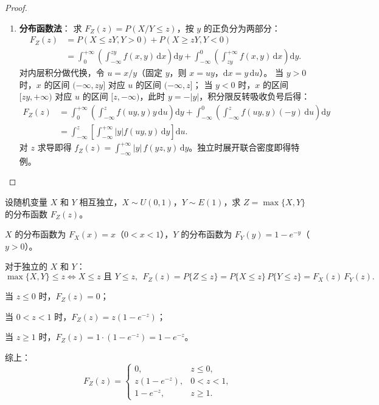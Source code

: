 \documentclass[lang=cn,11pt]{elegantbook}
\begin{document}
\begin{proof}
\begin{enumerate}
\begin{align*}
    \end{align*}
    对 $z$ 求导即得 $f_Z(z) = \displaystyle\int_{-\infty}^{+\infty}\frac{1}{|x|}\,f\!\left(x, \frac{z}{x}\right)\,\mathrm{d}x$。独立时展开联合密度即得特例。
    \item \textbf{分布函数法}：
    求 $F_Z(z) = P(X/Y \leqslant z)$，按 $y$ 的正负分为两部分：
    \begin{align*}
        F_Z(z) &= P(X \leqslant zY, Y > 0) + P(X \geqslant zY, Y < 0) \\
        &= \int_{0}^{+\infty} \left( \int_{-\infty}^{zy} f(x,y)\,\mathrm{d}x \right) \mathrm{d}y + \int_{-\infty}^{0} \left( \int_{zy}^{+\infty} f(x,y)\,\mathrm{d}x \right) \mathrm{d}y.
    \end{align*}
    对内层积分做代换，令 $u = x/y$（固定 $y$，则 $x = uy$，$\mathrm{d}x = y\,\mathrm{d}u$）。
    当 $y > 0$ 时，$x$ 的区间 $(-\infty, zy]$ 对应 $u$ 的区间 $(-\infty, z]$；
    当 $y < 0$ 时，$x$ 的区间 $[zy, +\infty)$ 对应 $u$ 的区间 $[z, -\infty)$，此时 $y = -|y|$，积分限反转吸收负号后得：
    \begin{align*}
    F_Z(z)& = \int_{0}^{+\infty} \left( \int_{-\infty}^{z} f(uy, y)y\,\mathrm{d}u \right) \mathrm{d}y + \int_{-\infty}^{0} \left( \int_{-\infty}^{z} f(uy, y)(-y)\,\mathrm{d}u \right) \mathrm{d}y\\
    & = \int_{-\infty}^{z} \left[ \int_{-\infty}^{+\infty} |y|f(uy, y)\,\mathrm{d}y \right] \mathrm{d}u.
    \end{align*}
    对 $z$ 求导即得 $f_Z(z) = \displaystyle\int_{-\infty}^{+\infty}|y|\,f(yz, y)\,\mathrm{d}y$。独立时展开联合密度即得特例。
\end{enumerate}
\end{proof}

\begin{exercise}\label{exer:3-7}
设随机变量 $X$ 和 $Y$ 相互独立，$X \sim U(0, 1)$，$Y \sim E(1)$，求 $Z = \max\{X, Y\}$ 的分布函数 $F_Z(z)$。
\end{exercise}

\begin{solution}
$X$ 的分布函数为 $F_X(x) = x$（$0 < x < 1$），$Y$ 的分布函数为 $F_Y(y) = 1 - e^{-y}$（$y > 0$）。

对于独立的 $X$ 和 $Y$：
\[
\max\{X, Y\} \leqslant z \iff X \leqslant z \text{ 且 } Y \leqslant z,~~
F_Z(z) = P\{Z \leqslant z\} = P\{X \leqslant z\}\,P\{Y \leqslant z\} = F_X(z)\,F_Y(z).
\]

当 $z \leqslant 0$ 时，$F_Z(z) = 0$；

当 $0 < z < 1$ 时，$F_Z(z) = z(1 - e^{-z})$；

当 $z \geqslant 1$ 时，$F_Z(z) = 1 \cdot (1-e^{-z}) = 1 - e^{-z}$。

综上：
\[
F_Z(z) = \begin{cases} 0, & z \leqslant 0, \\ z(1 - e^{-z}), & 0 < z < 1, \\ 1 - e^{-z}, & z \geqslant 1. \end{cases}
\]
\end{solution}
\end{document}
